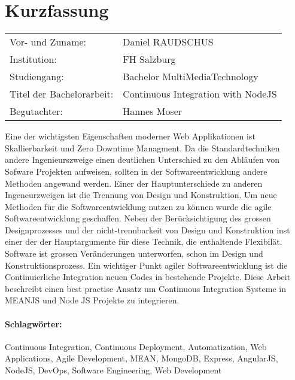 \section*{Kurzfassung}
\begin{tabular}{l l}
Vor- und Zuname:& Daniel RAUDSCHUS\\
Institution: & FH Salzburg\\
Studiengang: &  Bachelor MultiMediaTechnology\\
Titel der Bachelorarbeit: & Continuous Integration with NodeJS\\
Begutachter: & Hannes Moser\\
\end{tabular}
\vspace{0.5cm}

Eine der wichtigsten Eigenschaften moderner Web Applikationen ist Skallierbarkeit und Zero Downtime Managment. Da die Standardtechniken andere Ingenieurszweige
einen deutlichen Unterschied zu den Abläufen von Sofware Projekten aufweisen, sollten in der Softwareentwicklung andere Methoden angewand werden. Einer der
Hauptunterschiede zu anderen Ingeneurzweigen ist die Trennung von Design und Konstruktion. Um neue Methoden für die Softwareentwicklung nutzen zu können
wurde die agile Softwareentwicklung geschaffen. Neben der Berücksichtigung des grossen Designprozesses und der nicht-trennbarkeit von Design und Konstruktion
inst einer der der Hauptargumente für diese Technik, die enthaltende Flexibilät. Software ist grossen Veränderungen unterworfen, schon im Design und
Konstruktionsprozess. Ein wichtiger Punkt agiler Softwareentwicklung ist die Continuierliche Integration neuen Codes in bestehende Projekte. Diese Arbeit
beschreibt einen best practise Ansatz um Continuous Integration Systeme in MEANJS und Node JS Projekte zu integrieren.

\paragraph{Schlagwörter:}
Continuous Integration, Continuous Deployment, Automatization, Web Applications, Agile Development, MEAN, MongoDB, Express, AngularJS, NodeJS, DevOps, Software Engineering, Web Development
